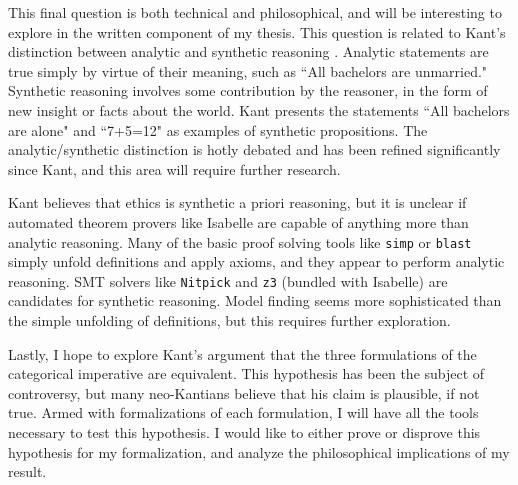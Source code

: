 \begin{isabellebody}
\begin{isamarkuptext}
This final question is both technical and philosophical, and will be interesting to explore in the written
component of my thesis. This question is related to Kant's distinction between analytic and synthetic reasoning \cite{groundwork}. 
Analytic statements are true simply by virtue of their meaning, such as ``All bachelors are unmarried." Synthetic 
reasoning involves some contribution by the reasoner, in the form of new insight or facts about the world.
Kant presents the statements ``All bachelors are alone" and ``7+5=12" as examples of synthetic propositions. 
The analytic/synthetic distinction is hotly debated and has been refined significantly since Kant, and this 
area will require further research.
 
Kant believes that ethics is synthetic a priori reasoning, but it is unclear if automated theorem provers 
like Isabelle are capable of anything more than analytic reasoning. Many of the basic proof solving 
tools like \texttt{simp} or \texttt{blast} simply unfold definitions and apply axioms, and they appear to 
perform analytic reasoning. SMT solvers like \texttt{Nitpick} and \texttt{z3} (bundled with Isabelle) are 
candidates for synthetic reasoning. Model finding seems more sophisticated than the simple unfolding
of definitions, but this requires further exploration.

Lastly, I hope to explore Kant's argument that the three formulations of the categorical imperative are 
equivalent. This hypothesis has been the subject of controversy, but many neo-Kantians believe that his 
claim is plausible, if not true. Armed with formalizations of each formulation, I will have all the tools 
necessary to test this hypothesis. I would like to either prove or disprove this hypothesis
for my formalization, and analyze the philosophical implications of my result.%
\end{isamarkuptext}\isamarkuptrue%
%
\isadelimtheory
%
\endisadelimtheory
%
\isatagtheory
%
\endisatagtheory
{\isafoldtheory}%
%
\isadelimtheory
%
\endisadelimtheory
%
\end{isabellebody}%
\endinput
